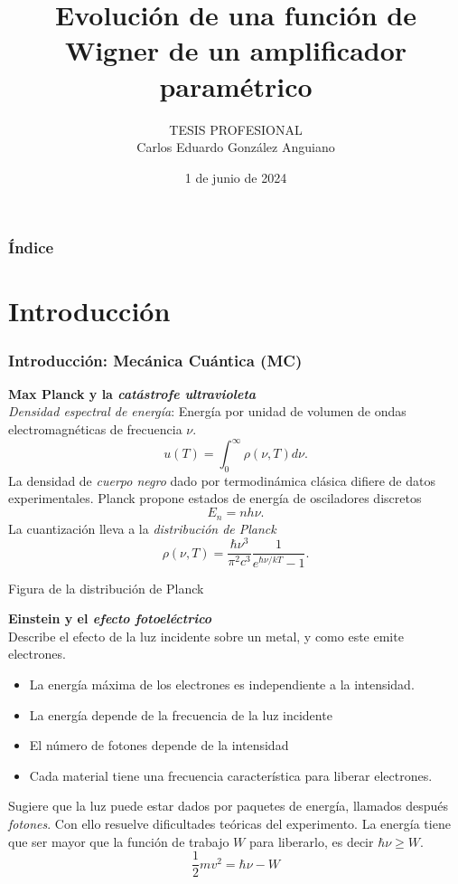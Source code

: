 \documentclass[xcolor=dvipsnames,slidestop,compress,mathserif, 11pt]{beamer}
\title[Tesis profesional]{Evoluci\'on de una funci\'on de Wigner de un amplificador param\'etrico}
\author{TESIS PROFESIONAL\\
Carlos Eduardo González Anguiano}
\institute{Departamento de Física ESFM-IPN}
\date{1 de junio de 2024}
\begin{document}
\maketitle


\begin{frame}
	\frametitle{Índice}
	\tableofcontents[pausesections]
\end{frame}

\section{Introducción}

\begin{frame}[c]
	\frametitle{Introducción: Mecánica Cuántica (MC)}
	\textbf{Max Planck y la \textit{catástrofe ultravioleta}}\\
	\justifying \textit{Densidad espectral de energía}: Energía por unidad de volumen de ondas electromagnéticas de frecuencia $\nu$.
	\begin{equation}
		u(T)=\int_{0}^{\infty}\rho(\nu, T)d\nu.
	\end{equation}
	\justifying La densidad de \textit{cuerpo negro} dado por termodinámica clásica difiere de datos experimentales.
	Planck propone estados de energía de osciladores discretos
	\begin{equation}
		E_n = nh\nu.
	\end{equation}
	\justifying La cuantización lleva a la \textit{distribución de Planck}
	\begin{equation}
		\rho(\nu, T) = \frac{\hbar \nu^3}{\pi^2 c^3} \frac{1}{e^{\hbar\nu/kT}-1}.
	\end{equation}
\end{frame}

\begin{frame}
	Figura de la distribución de Planck
\end{frame}

\begin{frame}
	\textbf{Einstein y el \textit{efecto fotoeléctrico}}\\
	\justifying Describe el efecto de la luz incidente sobre un metal, y como este emite electrones.
	\begin{itemize}
		\item La energía máxima de los electrones es independiente a la intensidad.
		\item La energía depende de la frecuencia de la luz incidente
		\item El número de fotones depende de la intensidad
		\item Cada material tiene una frecuencia característica para liberar electrones.
	\end{itemize}
	\justifying Sugiere que la luz puede estar dados por paquetes de energía, llamados después \textit{fotones}. Con ello resuelve dificultades teóricas del experimento. La energía tiene que ser mayor que la función de trabajo $W$ para liberarlo, es decir $\hbar \nu \geq W$.
	\begin{equation}
		\frac{1}{2}mv^2 = \hbar \nu - W
	\end{equation}
\end{frame}
\end{document}

